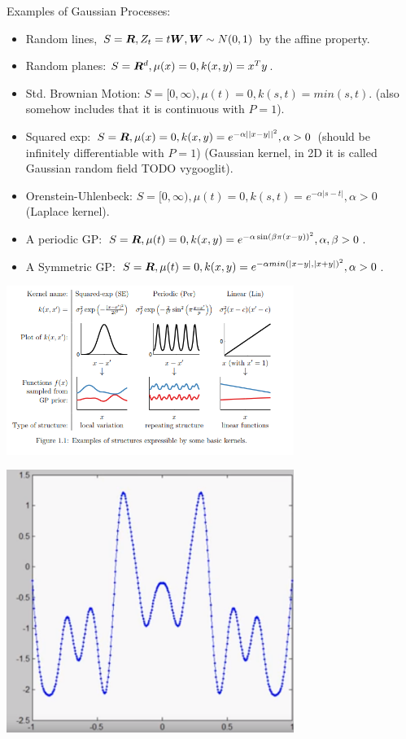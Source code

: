 Examples of Gaussian Processes:

\begin{itemize}
  \item Random lines, $S = {\bm{R}}, Z_t = t {\bm{W}}, {\bm{W}} \sim N(0, 1)$ by the affine property.
  \item Random planes: $S = {\bm{R}}^d, \mu(x) = 0, k(x,y) = x^T y$.
  \item Std. Brownian Motion: $S = [0, \infty), \mu(t) = 0, k(s, t) = min(s, t)$. (also somehow includes that it is continuous with $P = 1$).
  \item Squared exp: $S = {\bm{R}}, \mu(x) = 0, k(x,y) = e^{-\alpha ||x - y||^2}, \alpha > 0$ (should be infinitely differentiable with $P = 1$) (Gaussian kernel, in 2D it is called Gaussian random field {TODO vygooglit}).
  \item Orenstein-Uhlenbeck: $S = [0, \infty), \mu(t) = 0, k(s, t) = e^{-\alpha |s - t|}, \alpha > 0$ (Laplace kernel).
  \item A periodic GP: $S = {\bm{R}}, \mu(t) = 0, k(x, y) = e^{-\alpha \sin(\beta\pi(x - y))^2}, \alpha, \beta > 0$.
  \item A Symmetric GP: $S = {\bm{R}}, \mu(t) = 0, k(x, y) = e^{-\alpha min(|x-y|, |x+y|)^2}, \alpha>0$.
\end{itemize}

\includegraphics[width=0.7\textwidth]{img/kernels}

\includegraphics[width=0.7\textwidth]{img/symmetric-kernel}

